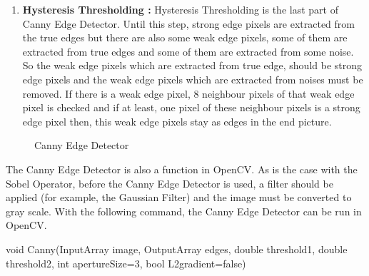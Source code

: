 \begin{enumerate}
\item \textbf{Hysteresis Thresholding : } Hysteresis Thresholding is the last part of Canny Edge Detector. Until this step, strong edge pixels are extracted from the true edges but there are also some weak edge pixels, some of them are extracted from true edges and some of them are extracted from some noise. So the weak edge pixels which are extracted from true edge, should be strong edge pixels and the weak edge pixels which are extracted from noises must be removed. If there is a weak edge pixel, 8 neighbour pixels of that weak edge pixel is checked and if at least, one pixel of these neighbour pixels is a strong edge pixel then, this weak edge pixels stay as edges in the end picture. 

\end{enumerate}


\begin{figure}[H]
  \centering
  \hfill
  \caption{Canny Edge Detector\cite{Canny_Edge_Detector}}
\end{figure} 

The Canny Edge Detector is also a function in OpenCV. As is the case with the Sobel Operator, before the Canny Edge Detector is used, a filter should be applied (for example, the Gaussian Filter) and the image must be converted to gray scale. With the following command, the Canny Edge Detector can be run in OpenCV.\cite{Canny_Edge_Detector3}

 \begin{center}
 
void Canny(InputArray image, OutputArray edges, double threshold1, double threshold2, int apertureSize=3, bool L2gradient=false)

 \end{center}
 
